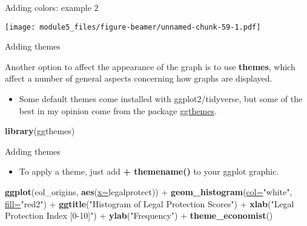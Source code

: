 \documentclass[ignorenonframetext,]{beamer}
\newenvironment{Shaded}{\begin{snugshade}}{\end{snugshade}}
\newcommand{\KeywordTok}[1]{\textcolor[rgb]{0.26,0.66,0.93}{\textbf{#1}}}
\newcommand{\DataTypeTok}[1]{\textcolor[rgb]{0.74,0.68,0.62}{\underline{#1}}}
\newcommand{\StringTok}[1]{\textcolor[rgb]{0.02,0.61,0.04}{#1}}
\newcommand{\OperatorTok}[1]{\textcolor[rgb]{0.74,0.68,0.62}{#1}}
\newcommand{\NormalTok}[1]{\textcolor[rgb]{0.74,0.68,0.62}{#1}}
\providecommand{\tightlist}{%
  \setlength{\itemsep}{0pt}\setlength{\parskip}{0pt}}
\begin{document}
\begin{frame}{Adding colors: example 2}

\texttt{[image: module5\_files/figure-beamer/unnamed-chunk-59-1.pdf]}

\end{frame}

\begin{frame}[fragile]{Adding themes}

Another option to affect the appearance of the graph is to use
\textbf{themes}, which affect a number of general aspects concerning how
graphs are displayed.

\begin{itemize}
\tightlist
\item
  Some default themes come installed with ggplot2/tidyverse, but some of
  the best in my opinion come from the package
  \href{https://github.com/jrnold/ggthemes}{ggthemes}.
\end{itemize}

\begin{Shaded}
\begin{Highlighting}[]
\KeywordTok{library}\NormalTok{(ggthemes)}
\end{Highlighting}
\end{Shaded}

\end{frame}

\begin{frame}[fragile]{Adding themes}

\begin{itemize}
\tightlist
\item
  To apply a theme, just add \textbf{+ themename()} to your ggplot
  graphic.
\end{itemize}

\begin{Shaded}
\begin{Highlighting}[]
\KeywordTok{ggplot}\NormalTok{(col_origins, }\KeywordTok{aes}\NormalTok{(}\DataTypeTok{x=}\NormalTok{legalprotect)) }\OperatorTok{+}\StringTok{ }
\StringTok{  }\KeywordTok{geom_histogram}\NormalTok{(}\DataTypeTok{col=}\StringTok{"white"}\NormalTok{, }\DataTypeTok{fill=}\StringTok{"red2"}\NormalTok{) }\OperatorTok{+}\StringTok{ }
\StringTok{  }\KeywordTok{ggtitle}\NormalTok{(}\StringTok{"Histogram of Legal Protection Scores"}\NormalTok{) }\OperatorTok{+}
\StringTok{  }\KeywordTok{xlab}\NormalTok{(}\StringTok{"Legal Protection Index [0-10]"}\NormalTok{) }\OperatorTok{+}
\StringTok{  }\KeywordTok{ylab}\NormalTok{(}\StringTok{"Frequency"}\NormalTok{) }\OperatorTok{+}\StringTok{ }
\StringTok{  }\KeywordTok{theme_economist}\NormalTok{()}
\end{Highlighting}
\end{Shaded}

\end{frame}
\end{document}

